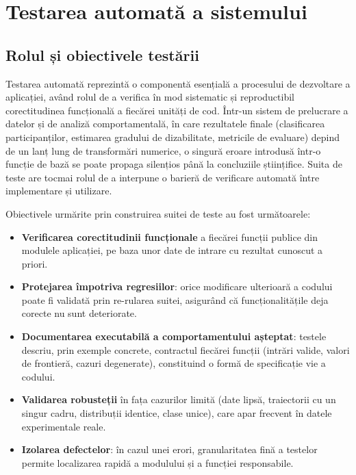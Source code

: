 
\section{Testarea automată a sistemului}
\label{sec:testare}

\subsection{Rolul și obiectivele testării}

Testarea automată reprezintă o componentă esențială a procesului de dezvoltare
a aplicației, având rolul de a verifica în mod sistematic și reproductibil
corectitudinea funcțională a fiecărei unități de cod. Într-un sistem de
prelucrare a datelor și de analiză comportamentală, în care rezultatele finale
(clasificarea participanților, estimarea gradului de dizabilitate, metricile de
evaluare) depind de un lanț lung de transformări numerice, o singură eroare
introdusă într-o funcție de bază se poate propaga silențios până la concluziile
științifice. Suita de teste are tocmai rolul de a interpune o barieră de
verificare automată între implementare și utilizare.

Obiectivele urmărite prin construirea suitei de teste au fost următoarele:

\begin{itemize}
  \item \textbf{Verificarea corectitudinii funcționale} a fiecărei funcții
        publice din modulele aplicației, pe baza unor date de intrare cu
        rezultat cunoscut a priori.
  \item \textbf{Protejarea împotriva regresiilor}: orice modificare ulterioară a
        codului poate fi validată prin re-rularea suitei, asigurând că
        funcționalitățile deja corecte nu sunt deteriorate.
  \item \textbf{Documentarea executabilă a comportamentului așteptat}: testele
        descriu, prin exemple concrete, contractul fiecărei funcții (intrări
        valide, valori de frontieră, cazuri degenerate), constituind o formă de
        specificație vie a codului.
  \item \textbf{Validarea robusteții} în fața cazurilor limită (date lipsă,
        traiectorii cu un singur cadru, distribuții identice, clase unice),
        care apar frecvent în datele experimentale reale.
  \item \textbf{Izolarea defectelor}: în cazul unei erori, granularitatea fină a
        testelor permite localizarea rapidă a modulului și a funcției
        responsabile.
\end{itemize}


